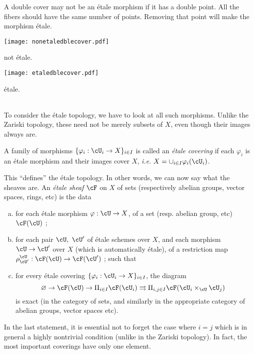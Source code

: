 A double cover may not be an \'etale morphism if it has a double point. All the fibers should have the same number of points. Removing that point will make the morphism \'etale. 
\\
\begin{minipage}{6cm}
\texttt{[image: nonetaledblecover.pdf]}\\
\begin{center}
\vspace{-2cm}
{\small not \'etale. \qquad \qquad}
\end{center}
\end{minipage}
\begin{minipage}{6cm}
\texttt{[image: etaledblecover.pdf]}\\
\begin{center}
\vspace{-2cm}
{\small \'etale. \qquad\qquad}
\end{center}
\end{minipage}
\vspace{1cm}
\\
To consider the \'etale topology, we have to look at all such morphisms. Unlike the Zariski topology, these need not be merely subsets of $X$, even though their images always are.

\begin{defi}
A family of morphisms $\{ \varphi_i : \cU_i \to X\}_{i \in I}$ is called an \emph{\'etale covering} if each $\varphi_i$ is an \'etale morphism and their images cover $X$, {\it i.e.} $X = \cup_{i \in I} \varphi_i (\cU_i)$.
\end{defi}
This ``defines'' the \'etale topology. In other words, we can now say what the sheaves are. An \emph{\'etale sheaf} $\cF$ on $X$ of sets (respectively abelian groups, vector spaces, rings, etc) is the data
\begin{enumerate}[(a)]
\item for each \'etale morphism $\varphi : \cU \to X$, of a set (resp. abelian group, etc) $\cF (\cU)$ ;
\item for each pair $\cU, \ \cU'$ of \'etale schemes over $X$, and each morphism $\cU \to \cU'$ over $X$ (which is automatically \'etale), of a restriction map $\rho^{\cU}_{\cU'} : \cF(\cU) \to \cF(\cU')$ ; such that
\item for every \'etale covering $\{ \varphi_i : \cU_i \to X\}_{i \in I}$, the diagram 
$$
\varnothing \to \cF (\cU) \to \Pi_{i \in I} \cF (\cU_i) \rightrightarrows \Pi_{i,j \in I} \cF (\cU_i \times_\cU \cU_j)
$$
is exact (in the category of sets, and similarly in the appropriate category of abelian groups, vector spaces etc). 
\end{enumerate} 
\begin{remark}
In the last statement, it is essential not to forget the case where $i = j$ which is in general a highly nontrivial condition (unlike in the Zariski topology). In fact, the most important coverings have only one element.
\end{remark}

